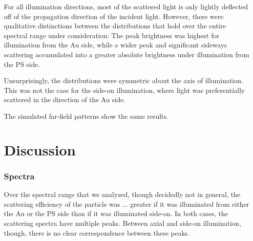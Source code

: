 \documentclass[10pt]{article}
\begin{document}
For all illumination directions, most of the scattered light is only lightly deflected off of the propagation direction of the incident light. 
However, there were qualitative distinctions between the distributions that hold over the entire spectral range under consideration:
The peak brightness was highest for illumination from the Au side, while a wider peak and significant sideways scattering accumulated into a greater absolute brightness under illumination from the PS side. 

Unsurprisingly, the distributions were symmetric about the axis of illumination. 
This was not the case for the side-on illumination, where light was preferentially scattered in the direction of the Au side. 









The simulated far-field patterns show the same results. 










\section*{Discussion}

\subsubsection*{Spectra}

Over the spectral range that we analyzed, though decidedly not in general, the scattering efficiency of the particle was ... greater if it was illuminated from either the Au or the PS side than if it was illuminated side-on. 
In both cases, the scattering spectra have multiple peaks. 
Between axial and side-on illumination, though, there is no clear correspondence between these peaks. 
\end{document}
